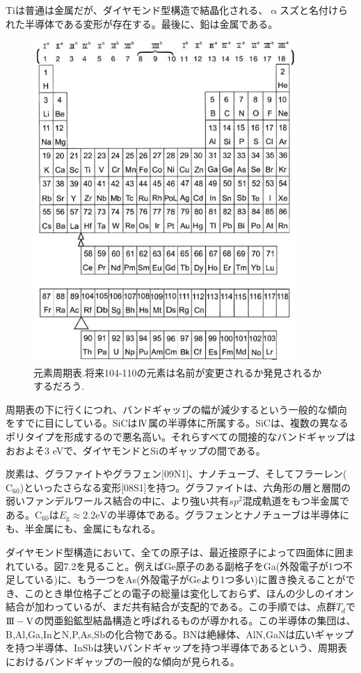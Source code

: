 \documentclass[11pt,a4j,uplatex]{jsarticle}
\begin{document}
Tiは普通は金属だが、ダイヤモンド型構造で結晶化される、$\upalpha$スズと名付けられた半導体である変形が存在する。最後に、鉛は金属である。

\renewcommand{\figurename}{表}
\begin{figure}[tb]
  \centering
  \includegraphics[clip,width=10cm]{8_1.JPG}
  \caption{元素周期表.将来104-110の元素は名前が変更されるか発見されるかするだろう.}
  \label{table8.1}
\end{figure}

周期表の下に行くにつれ、バンドギャップの幅が減少するという一般的な傾向をすでに目にしている。SiCは$\mathrm{I\hspace{-1pt}V}$属の半導体に所属する。SiCは、複数の異なるポリタイプを形成するので悪名高い。それらすべての間接的なバンドギャップはおおよそ3 eVで、ダイヤモンドとSiのギャップの間である。

炭素は、グラファイトやグラフェン[09N1]、ナノチューブ、そしてフラーレン($\mathrm{C_{60}}$)といったさらなる変形[08S1]を持つ。グラファイトは、六角形の層と層間の弱いファンデルワールス結合の中に、より強い共有$sp^2$混成軌道をもつ半金属である。$\mathrm{C_{60}}$は$E_{\mathrm{g}}\approx2.2 \mathrm{eV}$の半導体である。グラフェンとナノチューブは半導体にも、半金属にも、金属にもなれる。

ダイヤモンド型構造において、全ての原子は、最近接原子によって四面体に囲まれている。図7.2を見ること。例えばGe原子のある副格子をGa(外殻電子が1つ不足している)に、もう一つをAs(外殻電子がGeより1つ多い)に置き換えることができ、このとき単位格子ごとの電子の総量は変化しておらず、ほんの少しのイオン結合が加わっているが、まだ共有結合が支配的である。この手順では、点群$T_d$で$\mathrm{I\hspace{-1pt}I\hspace{-1pt}I-V}$の閃亜鉛鉱型結晶構造と呼ばれるものが導かれる。この半導体の集団は、B,Al,Ga,InとN,P,As,Sbの化合物である。BNは絶縁体、AlN,GaNは広いギャップを持つ半導体、InSbは狭いバンドギャップを持つ半導体であるという、周期表におけるバンドギャップの一般的な傾向が見られる。
\end{document}

